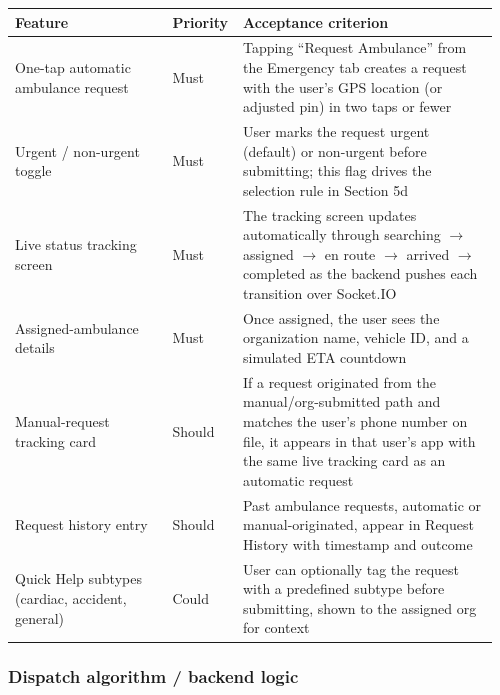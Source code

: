 \documentclass[11pt,a4paper]{article}
\begin{document}
\begin{longtable}{p{0.32\linewidth} p{0.12\linewidth} p{0.52\linewidth}}
\toprule
\textbf{Feature} & \textbf{Priority} & \textbf{Acceptance criterion} \\
\midrule
\endhead
One-tap automatic ambulance request & Must & Tapping ``Request Ambulance'' from the Emergency tab creates a request with the user's GPS location (or adjusted pin) in two taps or fewer \\
\addlinespace
Urgent / non-urgent toggle & Must & User marks the request urgent (default) or non-urgent before submitting; this flag drives the selection rule in Section 5d \\
\addlinespace
Live status tracking screen & Must & The tracking screen updates automatically through searching $\rightarrow$ assigned $\rightarrow$ en route $\rightarrow$ arrived $\rightarrow$ completed as the backend pushes each transition over Socket.IO \\
\addlinespace
Assigned-ambulance details & Must & Once assigned, the user sees the organization name, vehicle ID, and a simulated ETA countdown \\
\addlinespace
Manual-request tracking card & Should & If a request originated from the manual/org-submitted path and matches the user's phone number on file, it appears in that user's app with the same live tracking card as an automatic request \\
\addlinespace
Request history entry & Should & Past ambulance requests, automatic or manual-originated, appear in Request History with timestamp and outcome \\
\addlinespace
Quick Help subtypes (cardiac, accident, general) & Could & User can optionally tag the request with a predefined subtype before submitting, shown to the assigned org for context \\
\bottomrule
\end{longtable}

\subsubsection{Dispatch algorithm / backend logic}
\end{document}
